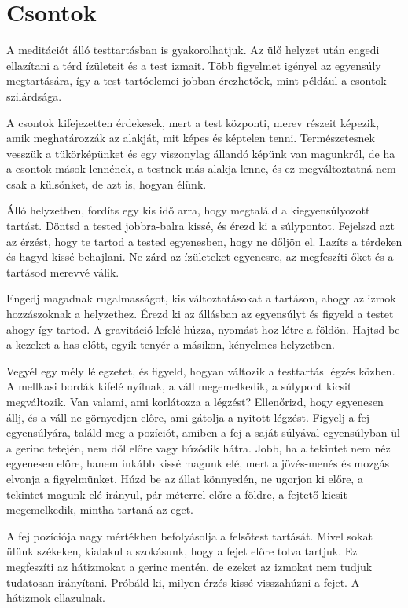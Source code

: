 \hypertarget{csontok-1}{%
\chapter{Csontok}\label{csontok-1}}

A meditációt álló testtartásban is gyakorolhatjuk. Az ülő helyzet után
engedi ellazítani a térd ízületeit és a test izmait. Több figyelmet
igényel az egyensúly megtartására, így a test tartóelemei jobban
érezhetőek, mint például a csontok szilárdsága.

A csontok kifejezetten érdekesek, mert a test központi, merev részeit
képezik, amik meghatározzák az alakját, mit képes és képtelen tenni.
Természetesnek vesszük a tükörképünket és egy viszonylag állandó képünk
van magunkról, de ha a csontok mások lennének, a testnek más alakja
lenne, és ez megváltoztatná nem csak a külsőnket, de azt is, hogyan
élünk.

Álló helyzetben, fordíts egy kis idő arra, hogy megtaláld a
kiegyensúlyozott tartást. Döntsd a tested jobbra-balra kissé, és érezd
ki a súlypontot. Fejelszd azt az érzést, hogy te tartod a tested
egyenesben, hogy ne dőljön el. Lazíts a térdeken és hagyd kissé
behajlani. Ne zárd az ízületeket egyenesre, az megfeszíti őket és a
tartásod merevvé válik.

Engedj magadnak rugalmasságot, kis változtatásokat a tartáson, ahogy az
izmok hozzászoknak a helyzethez. Érezd ki az állásban az egyensúlyt és
figyeld a testet ahogy így tartod. A gravitáció lefelé húzza, nyomást
hoz létre a földön. Hajtsd be a kezeket a has előtt, egyik tenyér a
másikon, kényelmes helyzetben.

Vegyél egy mély lélegzetet, és figyeld, hogyan változik a testtartás
légzés közben. A mellkasi bordák kifelé nyílnak, a váll megemelkedik, a
súlypont kicsit megváltozik. Van valami, ami korlátozza a légzést?
Ellenőrizd, hogy egyenesen állj, és a váll ne görnyedjen előre, ami
gátolja a nyitott légzést. Figyelj a fej egyensúlyára, találd meg a
pozíciót, amiben a fej a saját súlyával egyensúlyban ül a gerinc
tetején, nem dől előre vagy húzódik hátra. Jobb, ha a tekintet nem néz
egyenesen előre, hanem inkább kissé magunk elé, mert a jövés-menés és
mozgás elvonja a figyelmünket. Húzd be az állat könnyedén, ne ugorjon ki
előre, a tekintet magunk elé irányul, pár méterrel előre a földre, a
fejtető kicsit megemelkedik, mintha tartaná az eget.

A fej pozíciója nagy mértékben befolyásolja a felsőtest tartását. Mivel
sokat ülünk székeken, kialakul a szokásunk, hogy a fejet előre tolva
tartjuk. Ez megfeszíti az hátizmokat a gerinc mentén, de ezeket az
izmokat nem tudjuk tudatosan irányítani. Próbáld ki, milyen érzés kissé
visszahúzni a fejet. A hátizmok ellazulnak.

